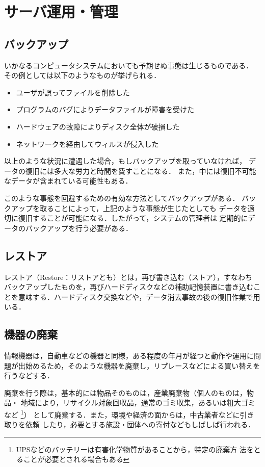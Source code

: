 \section{サーバ運用・管理}

\subsection{バックアップ}

いかなるコンピュータシステムにおいても予期せぬ事態は生じるものである．
その例としては以下のようなものが挙げられる．
\begin{itemize}
\item ユーザが誤ってファイルを削除した
\item プログラムのバグによりデータファイルが障害を受けた
\item ハードウェアの故障によりディスク全体が破損した
\item ネットワークを経由してウィルスが侵入した
\end{itemize}

以上のような状況に遭遇した場合，もしバックアップを取っていなければ，
データの復旧には多大な労力と時間を費すことになる．
また，中には復旧不可能なデータが含まれている可能性もある．

このような事態を回避するための有効な方法としてバックアップがある．
バックアップを取ることによって，上記のような事態が生じたとしても
データを適切に復旧することが可能になる．したがって，システムの管理者は
定期的にデータのバックアップを行う必要がある．


\subsection{レストア}

レストア（Restore：リストアとも）とは，再び書き込む（ストア），すなわち
バックアップしたものを，再びハードディスクなどの補助記憶装置に書き込むこ
とを意味する．ハードディスク交換などや，データ消去事故の後の復旧作業で用
いる．


\subsection{機器の廃棄}

情報機器は，自動車などの機器と同様，ある程度の年月が経つと動作や運用に問
題が出始めるため，そのような機器を廃棄し，リプレースなどによる買い替えを
行うなどする．

廃棄を行う際は，基本的には物品そのものは，産業廃棄物（個人のものは，物品・
地域により，リサイクル対象回収品，通常のゴミ収集，あるいは粗大ゴミなど
\footnote{UPSなどのバッテリーは有害化学物質があることから，特定の廃棄方
法をとることが必要とされる場合もある}）
として廃棄する．また，環境や経済の面からは，中古業者などに引き取りを依頼
したり，必要とする施設・団体への寄付などもしばしば行われる．

